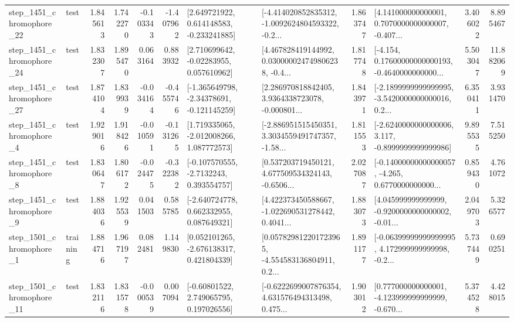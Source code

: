 \begin{tabular}{llrrrrllrlrr}
 step\_1451\_chromophore\_22 &      test &      1.845613 &    1.742270 &     -0.103343 & -1.407962 &    [2.649721922, 0.614148583, -0.233241885] &  [-4.414020852835312, -1.0092624804593322, -0.2... &       1.863747 &  [4.141000000000001, 0.7070000000000007, -0.407... &            3.406022 &          8.895467 \\
 step\_1451\_chromophore\_24 &      test &      1.832307 &    1.895470 &      0.063164 &  0.883932 &     [2.710699642, -0.02283955, 0.057610962] &  [4.467828419144992, 0.030000024749806238, -0.4... &       1.817748 &  [-4.154, 0.17600000000000193, -0.4640000000000... &            5.503047 &         11.882069 \\
 step\_1451\_chromophore\_27 &      test &      1.874104 &    1.839939 &     -0.034164 & -0.455746 &   [-1.365649798, -2.34378691, -0.121145259] &  [2.286970818842405, 3.9364338723078, -0.000801... &       1.843971 &  [-2.1899999999999995, -3.5420000000000016, 0.2... &            6.350411 &          3.931470 \\
  step\_1451\_chromophore\_4 &      test &      1.929016 &    1.918426 &     -0.010591 & -0.131265 &    [1.719335065, -2.012008266, 1.087772573] &  [-2.886951515450351, 3.3034559491747357, -1.58... &       1.811553 &  [-2.6240000000000006, 3.117, -0.8999999999999986] &            9.895535 &          7.515250 \\
  step\_1451\_chromophore\_8 &      test &      1.830647 &    1.806172 &     -0.024475 & -0.322382 &     [-0.107570555, -2.7132243, 0.393554757] &  [0.537203719450121, 4.677509534324143, -0.6506... &       2.027087 &  [-0.14000000000000057, -4.265, 0.6770000000000... &            0.859430 &          4.761072 \\
  step\_1451\_chromophore\_9 &      test &      1.884036 &    1.925539 &      0.041503 &  0.585785 &    [-2.640724778, 0.662332955, 0.087649321] &  [4.422373450588667, -1.022690531278442, 0.4041... &       1.883073 &  [4.045999999999999, -0.9200000000000002, -0.01... &            2.049703 &          5.326577 \\
  step\_1501\_chromophore\_1 &  training &      1.884716 &    1.967197 &      0.082481 &  1.149830 &    [0.052101265, -2.676138317, 0.421804339] &  [0.057829812201723965, -4.554583136804911, 0.2... &       1.891177 &  [-0.06399999999999995, 4.172999999999998, -0.2... &            5.737449 &          0.690251 \\
 step\_1501\_chromophore\_11 &      test &      1.832116 &    1.831578 &     -0.000539 &  0.007094 &     [-0.60801522, 2.749065795, 0.197026556] &  [-0.6222699007876354, 4.631576494313498, 0.475... &       1.903012 &  [0.777000000000001, -4.123999999999999, -0.670... &            5.374528 &          4.428015 \\

\end{tabular}
